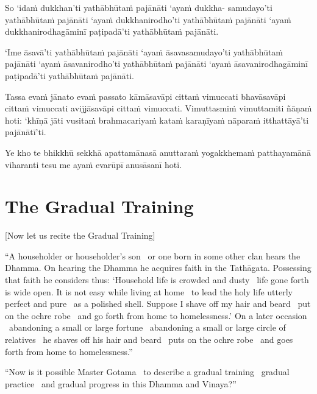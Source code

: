 So ‘idaṁ dukkhan’ti yathābhūtaṁ pajānāti ‘ayaṁ dukkha- samudayo’ti yathābhūtaṁ pajānāti ‘ayaṁ dukkhanirodho’ti yathābhūtaṁ pajānāti ‘ayaṁ dukkhanirodhagāminī paṭipadā’ti yathābhūtaṁ pajānāti.

‘Ime āsavā’ti yathābhūtaṁ pajānāti ‘ayaṁ āsavasamudayo’ti yathābhūtaṁ pajānāti ‘ayaṁ āsavanirodho’ti yathābhūtaṁ pajānāti ‘ayaṁ āsavanirodhagāminī paṭipadā’ti yathābhūtaṁ pajānāti.

Tassa evaṁ jānato evaṁ passato kāmāsavāpi cittaṁ vimuccati bhavāsavāpi cittaṁ vimuccati avijjāsavāpi cittaṁ vimuccati. Vimuttasmiṁ vimuttamiti ñāṇaṁ hoti: ‘khīṇā jāti vusitaṁ brahmacariyaṁ kataṁ karaṇīyaṁ nāparaṁ itthattāyā’ti pajānātī’ti.

\suttaRef{[MN 39]}

Ye kho te bhikkhū sekkhā apattamānasā anuttaraṁ yogakkhemaṁ patthayamānā viharanti tesu me ayaṁ evarūpī anusāsanī hoti.

\suttaRef{[MN 107]}

\clearpage

\section{The Gradual Training}
\label{gradual-training}

\begin{center}
  [Now let us recite the Gradual Training]
\end{center}

\begin{justify}
“A householder or householder’s son \breathmark\ or one born in some other clan hears the Dhamma. On hearing the Dhamma he acquires faith in the Tathāgata. Possessing that faith he considers thus: ‘Household life is crowded and dusty \breathmark\ life gone forth is wide open. It is not easy while living at home \breathmark\ to lead the holy life utterly perfect and pure \breathmark\ as a polished shell. Suppose I shave off my hair and beard \breathmark\ put on the ochre robe \breathmark\ and go forth from home to homelessness.’ On a later occasion \breathmark\ abandoning a small or large fortune \breathmark\ abandoning a small or large circle of relatives \breathmark\ he shaves off his hair and beard \breathmark\ puts on the ochre robe \breathmark\ and goes forth from home to homelessness.”
\end{justify}

\suttaRef{[MN 27 / 38 / 51]}

\begin{justify}
“Now is it possible Master Gotama \breathmark\ to describe a gradual training \breathmark\ gradual practice \breathmark\ and gradual progress in this Dhamma and Vinaya?”
\end{justify}


